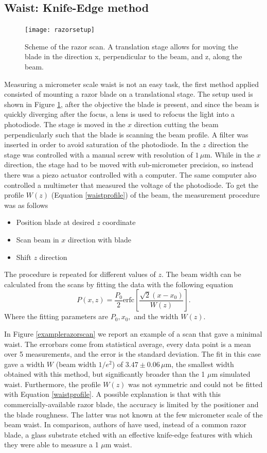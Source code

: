 \subsection{Waist: Knife-Edge method}
\label{sec:knifeedge}
\begin{figure}[H]
\centering
\texttt{[image: razorsetup]}
\caption{Scheme of the razor scan. A translation stage allows for moving the blade in the direction x, perpendicular to the beam, and z, along the beam.}
\label{razorscan}
\end{figure}
Measuring a micrometer scale waist is not an easy task, the first method applied consisted of mounting a razor blade on a translational stage. The setup used is shown in Figure \ref{razorscan}, after the objective the blade is present, and since the beam is quickly diverging after the focus, a lens is used to refocus the light into a photodiode. The stage is moved in the $x$ direction cutting the beam perpendicularly such that the blade is scanning the beam profile. A filter was inserted in order to avoid saturation of the photodiode.
In the $z$ direction the stage was controlled with a manual screw with resolution of $1\,\mu$m. While in the $x$ direction, the stage had to be moved with sub-micrometer precision, so instead there was a piezo actuator controlled with a computer. The same computer also controlled a multimeter that measured the voltage of the photodiode. To get the profile $W(z)$ (Equation \eqref{waistprofile}) of the beam, the measurement procedure was as follows
\begin{itemize}
\item Position blade at desired $z$ coordinate
\item Scan beam in $x$ direction with blade
\item Shift $z$ direction
\end{itemize}
The procedure is repeated for different values of $z$. The beam width can be calculated from the scans by fitting the data with the following equation \cite{knifeedge}
\begin{equation}
\label{eq:razerbladefit}
P(x,z) = \frac{P_0}{2}\text{erfc}\left[\frac{\sqrt{2}(x-x_0)}{W(z)} \right].
\end{equation}
Where the fitting parameters are $P_0, x_0,$ and the width $W(z)$.\par
In Figure \ref{examplerazorscan} we report an example of a scan that gave a minimal waist. The errorbars come from statistical average, every data point is a mean over 5 measurements, and the error is the standard deviation. The fit in this case gave a width $W$ (beam width $1/e^2$) of $3.47\pm 0.06\,\mu$m, the smallest width obtained with this method, but significantly broader than the 1 $\mu$m simulated waist. Furthermore, the profile $W(z)$ was not symmetric and could not be fitted with Equation \eqref{waistprofile}. A possible explanation is that with this commercially-available razor blade, the accuracy is limited by the positioner and the blade roughness. The latter was not known at the few micrometer scale of the beam waist. In comparison, authors of \cite{Cannon:86} have used, instead of a common razor blade, a glass substrate etched with an effective knife-edge features with which they were able to measure a 1 $\mu$m waist.
